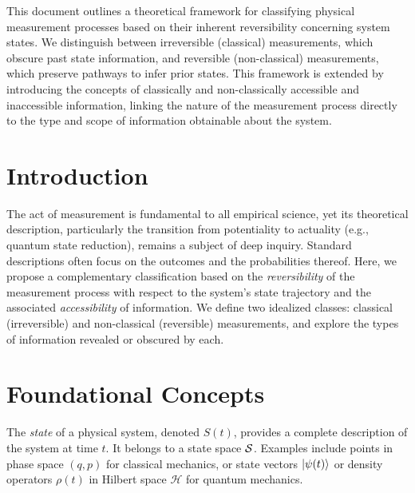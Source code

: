 
	
	
	





		This document outlines a theoretical framework for classifying physical measurement processes based on their inherent reversibility concerning system states. We distinguish between irreversible (classical) measurements, which obscure past state information, and reversible (non-classical) measurements, which preserve pathways to infer prior states. This framework is extended by introducing the concepts of classically and non-classically accessible and inaccessible information, linking the nature of the measurement process directly to the type and scope of information obtainable about the system.

	
	
	\section{Introduction}
	The act of measurement is fundamental to all empirical science, yet its theoretical description, particularly the transition from potentiality to actuality (e.g., quantum state reduction), remains a subject of deep inquiry. Standard descriptions often focus on the outcomes and the probabilities thereof. Here, we propose a complementary classification based on the \emph{reversibility} of the measurement process with respect to the system's state trajectory and the associated \emph{accessibility} of information. We define two idealized classes: classical (irreversible) and non-classical (reversible) measurements, and explore the types of information revealed or obscured by each.
	
	\section{Foundational Concepts}
	
	\begin{definition}
		The \emph{state} of a physical system, denoted $S(t)$, provides a complete description of the system at time $t$. It belongs to a state space $\mathcal{S}$. Examples include points in phase space $(q,p)$ for classical mechanics, or state vectors $\left|{\psi(t)}\right\rangle$ or density operators $\rho(t)$ in Hilbert space $\mathcal{H}$ for quantum mechanics.
	\end{definition}
	
